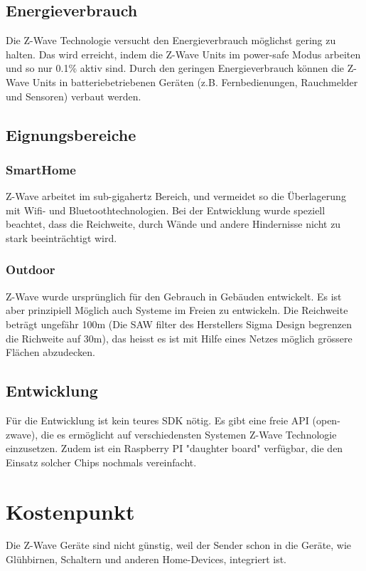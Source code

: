 \documentclass[a4paper,11pt]{article}
\begin{document}
\subsection*{Energieverbrauch}
Die Z-Wave Technologie versucht den Energieverbrauch möglichst gering zu halten. Das wird erreicht, indem die Z-Wave Units im power-safe Modus arbeiten und so nur 0.1\% aktiv sind. Durch den geringen Energieverbrauch können die Z-Wave Units in batteriebetriebenen Geräten (z.B. Fernbedienungen, Rauchmelder und Sensoren) verbaut werden.

\subsection*{Eignungsbereiche}
\subsubsection*{SmartHome}
Z-Wave arbeitet im sub-gigahertz Bereich, und vermeidet so die Überlagerung mit Wifi- und Bluetoothtechnologien. Bei der Entwicklung wurde speziell beachtet, dass die Reichweite, durch Wände und andere Hindernisse nicht zu stark beeinträchtigt wird.

\subsubsection*{Outdoor}
Z-Wave wurde ursprünglich für den Gebrauch in Gebäuden entwickelt. Es ist aber prinzipiell Möglich auch Systeme im Freien zu entwickeln. Die Reichweite beträgt ungefähr 100m (Die SAW filter des Herstellers Sigma Design begrenzen die Richweite auf 30m), das heisst es ist mit Hilfe eines Netzes möglich grössere Flächen abzudecken.

\subsection*{Entwicklung}
Für die Entwicklung ist kein teures SDK nötig. Es gibt eine freie API (open-zwave), die es ermöglicht auf verschiedensten Systemen Z-Wave Technologie einzusetzen. Zudem ist ein Raspberry PI "daughter board" verfügbar, die den Einsatz solcher Chips nochmals vereinfacht.

\newpage

\section*{Kostenpunkt}
Die Z-Wave Geräte sind nicht günstig, weil der Sender schon in die Geräte, wie Glühbirnen, Schaltern und anderen Home-Devices, integriert ist.\\
\end{document}
